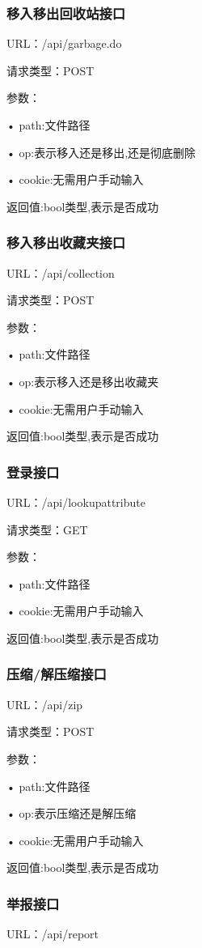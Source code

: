 \subsubsection{移入移出回收站接口}
URL：/api/garbage.do

请求类型：POST

参数：

• path:文件路径

• op:表示移入还是移出,还是彻底删除

• cookie:无需用户手动输入

返回值:bool类型,表示是否成功

\subsubsection{移入移出收藏夹接口}
URL：/api/collection

请求类型：POST

参数：

• path:文件路径

• op:表示移入还是移出收藏夹

• cookie:无需用户手动输入

返回值:bool类型,表示是否成功
 
\subsubsection{登录接口}
URL：/api/lookupattribute

请求类型：GET

参数：

• path:文件路径

• cookie:无需用户手动输入

返回值:bool类型,表示是否成功

\subsubsection{压缩/解压缩接口}
URL：/api/zip

请求类型：POST

参数： 

• path:文件路径

• op:表示压缩还是解压缩

• cookie:无需用户手动输入

返回值:bool类型,表示是否成功

\subsubsection{举报接口}
URL：/api/report

